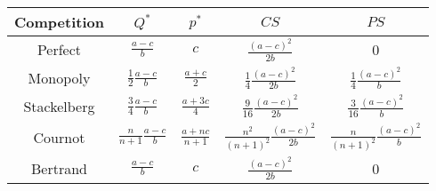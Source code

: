 \documentclass[]{standalone}
\begin{document}
\bgroup
\def\arraystretch{2}%
\begin{tabular}{|c|c|c|c|c|}
\hline
Competition & $Q^*$                        & $p^*$              & $CS$                                    & $PS$                                 \\ \hline
Perfect     & $\frac{a-c}{b}$              & $c$                & $\frac{(a-c)^2}{2b}$                    & 0                                    \\ \hline
Monopoly    & $\frac{1}{2}\frac{a-c}{b}$   & $\frac{a+c}{2}$    & $\frac{1}{4}\frac{(a-c)^2}{2b}$         & $\frac{1}{4}\frac{(a-c)^2}{b}$       \\ \hline
Stackelberg & $\frac{3}{4}\frac{a-c}{b}$   & $\frac{a+3c}{4}$   & $\frac{9}{16}\frac{(a-c)^2}{2b}$        & $\frac{3}{16}\frac{(a-c)^2}{b}$      \\ \hline
Cournot     & $\frac{n}{n+1}\frac{a-c}{b}$ & $\frac{a+nc}{n+1}$ & $\frac{n^2}{(n+1)^2}\frac{(a-c)^2}{2b}$ & $\frac{n}{(n+1)^2}\frac{(a-c)^2}{b}$ \\ \hline
Bertrand    & $\frac{a-c}{b}$              & $c$                & $\frac{(a-c)^2}{2b}$                    & 0                                    \\ \hline
\end{tabular}
\egroup
\end{document}
